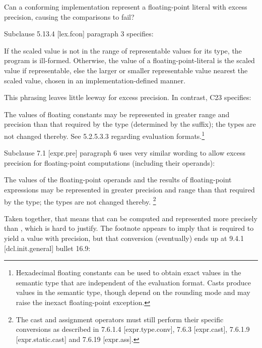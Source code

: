 Can a conforming implementation represent a floating-point literal with excess
precision, causing the comparisons to fail?

Subclause 5.13.4 [lex.fcon] paragraph 3 specifies:

\begin{wgText}
  \setcounter{Paras}{2}\pnum
  If the scaled value is not in the range of representable values for its type,
  the program is ill-formed. Otherwise, the value of a floating-point-literal
  is the scaled value if representable, else the larger or smaller
  representable value nearest the scaled value, chosen in an
  implementation-defined manner.
\end{wgText}

This phrasing leaves little leeway for excess precision.
In contrast, C23 specifies:

\begin{wgText}
  \setcounter{Paras}{5}\pnum
  The values of floating constants may be represented in greater range and
  precision than that required by the type (determined by the suffix); the
  types are not changed thereby. See 5.2.5.3.3 regarding evaluation
  formats.\footnote{Hexadecimal floating constants can be used to obtain exact
    values in the semantic type that are independent of the evaluation format.
    Casts produce values in the semantic type, though depend on the rounding
    mode and may raise the inexact floating-point exception.}
\end{wgText}

Subclause 7.1 [expr.pre] paragraph 6 uses very similar wording to allow excess
precision for floating-point computations (including their operands):

\begin{wgText}
  \setcounter{Paras}{5}\pnum
  The values of the floating-point operands and the results of floating-point
  expressions may be represented in greater precision and range than that
  required by the type; the types are not changed thereby.%
  \footnote{The cast and assignment operators must still perform their specific
    conversions as described in 7.6.1.4 [expr.type.conv], 7.6.3 [expr.cast],
    7.6.1.9 [expr.static.cast] and 7.6.19 [expr.ass].}
\end{wgText}

Taken together, that means that  can be computed and
represented more precisely than , which is hard to justify.
The footnote appears to imply that  is required to yield a
value with \float precision, but that conversion (eventually) ends up at 9.4.1
[dcl.init.general] bullet 16.9:

